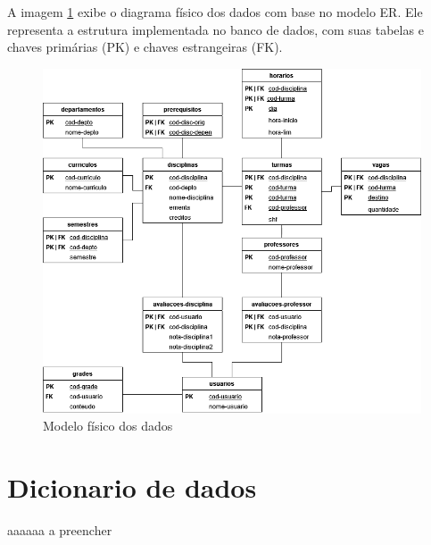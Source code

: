 A imagem \ref{fig:modelo-fisico} exibe o diagrama físico dos dados com base no modelo ER. Ele representa a estrutura implementada no banco de dados, com suas tabelas e chaves primárias (PK) e chaves estrangeiras (FK).

\begin{figure}[ht]
    \begin{center}
    \includegraphics[width=390pt]{figuras/modelo-fisico.png}
    \caption{Modelo físico dos dados}
    \label{fig:modelo-fisico}
    \end{center}
\end{figure}

\section{Dicionario de dados}

aaaaaa a preencher

